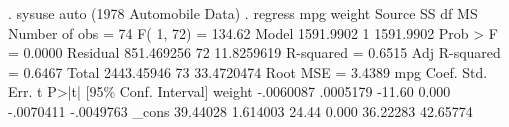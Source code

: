 . sysuse auto
(1978 Automobile Data)
{\smallskip}
. regress mpg weight
{\smallskip}
      Source {\VBAR}       SS       df       MS              Number of obs =      74
           F(  1,    72) =  134.62
       Model {\VBAR}   1591.9902     1   1591.9902           Prob > F      =  0.0000
    Residual {\VBAR}  851.469256    72  11.8259619           R-squared     =  0.6515
           Adj R-squared =  0.6467
       Total {\VBAR}  2443.45946    73  33.4720474           Root MSE      =  3.4389
{\smallskip}
         mpg {\VBAR}      Coef.   Std. Err.      t    P>|t|     [95\% Conf. Interval]
      weight {\VBAR}  -.0060087   .0005179   -11.60   0.000    -.0070411   -.0049763
       _cons {\VBAR}   39.44028   1.614003    24.44   0.000     36.22283    42.65774
